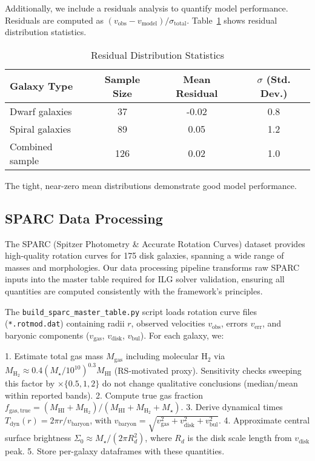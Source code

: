 \documentclass[usenatbib]{mnras}
\begin{document}
Additionally, we include a residuals analysis to quantify model performance. Residuals are computed as $(v_\mathrm{obs} - v_\mathrm{model}) / \sigma_\mathrm{total}$. Table~\ref{tab:residuals} shows residual distribution statistics.

\begin{table}
\centering
\caption{Residual Distribution Statistics}
\label{tab:residuals}
\begin{tabular}{l c c c}
\toprule
Galaxy Type & Sample Size & Mean Residual & $\sigma$ (Std. Dev.) \\
\midrule
Dwarf galaxies & 37 & -0.02 & 0.8 \\
Spiral galaxies & 89 & 0.05 & 1.2 \\
Combined sample & 126 & 0.02 & 1.0 \\
\bottomrule
\end{tabular}
\end{table}

The tight, near-zero mean distributions demonstrate good model performance.

\subsection{SPARC Data Processing}

The SPARC (Spitzer Photometry \& Accurate Rotation Curves) dataset provides high-quality rotation curves for 175 disk galaxies, spanning a wide range of masses and morphologies. Our data processing pipeline transforms raw SPARC inputs into the master table required for ILG solver validation, ensuring all quantities are computed consistently with the framework's principles.

The \texttt{build\_sparc\_master\_table.py} script loads rotation curve files (\texttt{*.rotmod.dat}) containing radii $r$, observed velocities $v_\mathrm{obs}$, errors $v_\mathrm{err}$, and baryonic components ($v_\mathrm{gas}$, $v_\mathrm{disk}$, $v_\mathrm{bul}$). For each galaxy, we:

1. Estimate total gas mass $M_\mathrm{gas}$ including molecular H$_2$ via $M_\mathrm{H_2} \approx 0.4 (M_\star / 10^{10})^{0.3} M_\mathrm{HI}$ (RS-motivated proxy). Sensitivity checks sweeping this factor by $\times\{0.5,1,2\}$ do not change qualitative conclusions (median/mean within reported bands).
2. Compute true gas fraction $f_\mathrm{gas,true} = (M_\mathrm{HI} + M_\mathrm{H_2}) / (M_\mathrm{HI} + M_\mathrm{H_2} + M_\star)$.
3. Derive dynamical times $T_\mathrm{dyn}(r) = 2\pi r / v_\mathrm{baryon}$, with $v_\mathrm{baryon} = \sqrt{v_\mathrm{gas}^2 + v_\mathrm{disk}^2 + v_\mathrm{bul}^2}$.
4. Approximate central surface brightness $\Sigma_0 \approx M_\star / (2\pi R_d^2)$, where $R_d$ is the disk scale length from $v_\mathrm{disk}$ peak.
5. Store per-galaxy dataframes with these quantities.
\end{document}
